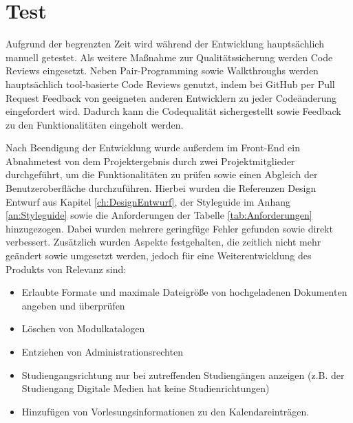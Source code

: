 \section{Test}
Aufgrund der begrenzten Zeit wird während der Entwicklung hauptsächlich manuell getestet. 
Als weitere Maßnahme zur Qualitätssicherung werden Code Reviews eingesetzt.
Neben Pair-Programming sowie Walkthroughs werden hauptsächlich tool-basierte Code Reviews genutzt, indem bei GitHub per Pull Request Feedback von geeigneten anderen Entwicklern zu jeder Codeänderung eingefordert wird.
Dadurch kann die Codequalität sichergestellt sowie Feedback zu den Funktionalitäten eingeholt werden.

Nach Beendigung der Entwicklung wurde außerdem im Front-End ein Abnahmetest von dem Projektergebnis durch zwei Projektmitglieder durchgeführt, um die Funktionalitäten zu prüfen sowie einen Abgleich der Benutzeroberfläche durchzuführen. 
Hierbei wurden die Referenzen Design Entwurf aus Kapitel \vref{ch:DesignEntwurf}, der Styleguide im Anhang \vref{an:Styleguide} sowie die Anforderungen der Tabelle \vref{tab:Anforderungen} hinzugezogen.
Dabei wurden mehrere geringfüge Fehler gefunden sowie direkt verbessert.
Zusätzlich wurden Aspekte festgehalten, die zeitlich nicht mehr geändert sowie umgesetzt werden, jedoch für eine Weiterentwicklung des Produkts von Relevanz sind: 

\begin{itemize}
    \item Erlaubte Formate und maximale Dateigröße von hochgeladenen Dokumenten angeben und überprüfen
    \item Löschen von Modulkatalogen 
    \item Entziehen von Administrationsrechten
    \item Studiengangsrichtung nur bei zutreffenden Studiengängen anzeigen (z.B. der Studiengang Digitale Medien hat keine Studienrichtungen)
    \item Hinzufügen von Vorlesungsinformationen zu den Kalendareinträgen.
\end{itemize}
